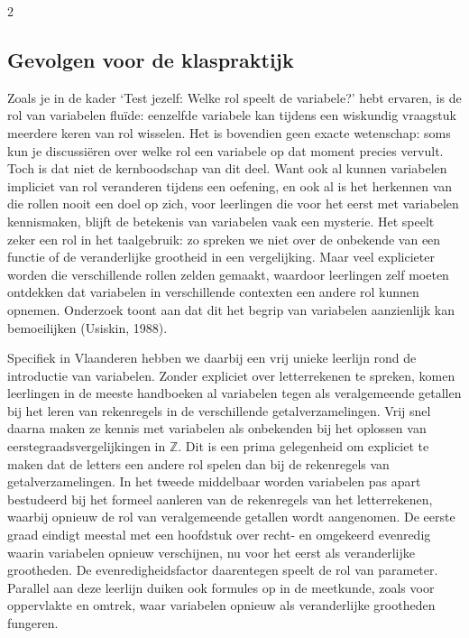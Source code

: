 \begin{multicols}{2}

\subsection{Gevolgen voor de klaspraktijk}
Zoals je in de kader ‘Test jezelf: Welke rol speelt de variabele?’ hebt ervaren, is de rol van variabelen fluïde: eenzelfde variabele kan tijdens een wiskundig vraagstuk meerdere keren van rol wisselen. Het is bovendien geen exacte wetenschap: soms kun je discussiëren over welke rol een variabele op dat moment precies vervult. Toch is dat niet de kernboodschap van dit deel. Want ook al kunnen variabelen impliciet van rol veranderen tijdens een oefening, en ook al is het herkennen van die rollen nooit een doel op zich, voor leerlingen die voor het eerst met variabelen kennismaken, blijft de betekenis van variabelen vaak een mysterie. Het speelt zeker een rol in het taalgebruik: zo spreken we niet over de onbekende van een functie of de veranderlijke grootheid in een vergelijking. Maar veel explicieter worden die verschillende rollen zelden gemaakt, waardoor leerlingen zelf moeten ontdekken dat variabelen in verschillende contexten een andere rol kunnen opnemen. Onderzoek toont aan dat dit het begrip van variabelen aanzienlijk kan bemoeilijken (Usiskin, 1988). 

Specifiek in Vlaanderen hebben we daarbij een vrij unieke leerlijn rond de introductie van variabelen. Zonder expliciet over letterrekenen te spreken, komen leerlingen in de meeste handboeken al variabelen tegen als veralgemeende getallen bij het leren van rekenregels in de verschillende getalverzamelingen. Vrij snel daarna maken ze kennis met variabelen als onbekenden bij het oplossen van eerstegraadsvergelijkingen in $\mathbb{Z}$. Dit is een prima gelegenheid om expliciet te maken dat de letters een andere rol spelen dan bij de rekenregels van getalverzamelingen. In het tweede middelbaar worden variabelen pas apart bestudeerd bij het formeel aanleren van de rekenregels van het letterrekenen, waarbij opnieuw de rol van veralgemeende getallen wordt aangenomen. De eerste graad eindigt meestal met een hoofdstuk over recht- en omgekeerd evenredig waarin variabelen opnieuw verschijnen, nu voor het eerst als veranderlijke grootheden. De evenredigheidsfactor daarentegen speelt de rol van parameter. Parallel aan deze leerlijn duiken ook formules op in de meetkunde, zoals voor oppervlakte en omtrek, waar variabelen opnieuw als veranderlijke grootheden fungeren. 


\end{multicols}
